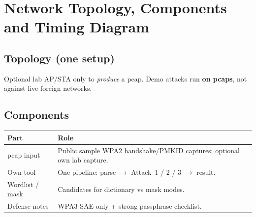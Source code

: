 \documentclass[11pt,a4paper]{article}
\begin{document}
\section{Network Topology, Components and Timing Diagram}

\subsection{Topology (one setup)}
\begin{center}
\end{center}

\noindent Optional lab AP/STA only to \emph{produce} a pcap. Demo attacks run
\textbf{on pcaps}, not against live foreign networks.

\subsection{Components}
\begin{center}
\begin{tabularx}{\textwidth}{@{}l X@{}}
\toprule
\textbf{Part} & \textbf{Role} \\
\midrule
pcap input & Public sample WPA2 handshake/PMKID captures; optional own lab capture. \\
Own tool & One pipeline: parse $\rightarrow$ Attack~1 / 2 / 3 $\rightarrow$ result. \\
Wordlist / mask & Candidates for dictionary vs mask modes. \\
Defense notes & WPA3-SAE-only + strong passphrase checklist. \\
\bottomrule
\end{tabularx}
\end{center}
\end{document}
